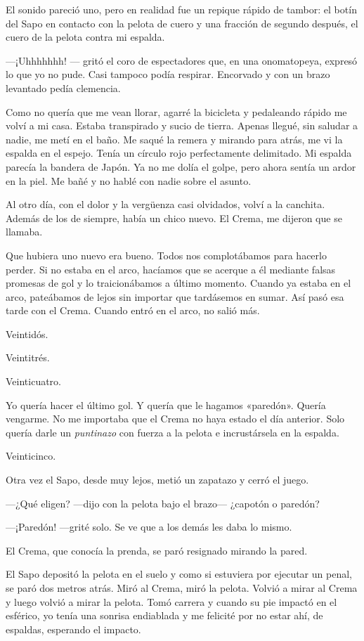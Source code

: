 \documentclass[11pt,twoside,openright]{book}
\begin{document}
 El sonido pareció uno, pero en realidad fue un repique rápido de tambor: el
 botín del Sapo en contacto con la pelota de cuero y una fracción de segundo
 después, el cuero de la pelota contra mi espalda.
 
 ---¡Uhhhhhhh! --- gritó el coro de espectadores que, en una onomatopeya,
 expresó lo que yo no pude. Casi tampoco podía respirar. Encorvado y con un
 brazo levantado pedía clemencia.
 
 Como no quería que me vean llorar, agarré la bicicleta y pedaleando rápido me
 volví a mi casa. Estaba transpirado y sucio de tierra. Apenas llegué, sin
 saludar a nadie, me metí en el baño. Me saqué la remera y mirando para atrás,
 me vi la espalda en el espejo. Tenía un círculo rojo perfectamente delimitado.
 Mi espalda parecía la bandera de Japón. Ya no me dolía el golpe, pero ahora
 sentía un ardor en la piel. Me bañé y no hablé con nadie sobre el asunto.
 
 Al otro día, con el dolor y la vergüenza casi olvidados, volví a la canchita.
 Además de los de siempre, había un chico nuevo.  El Crema, me dijeron que se
 llamaba.
 
 Que hubiera uno nuevo era bueno. Todos nos complotábamos para hacerlo perder.
 Si no estaba en el arco, hacíamos que se acerque a él mediante falsas promesas
 de gol y lo traicionábamos a último momento. Cuando ya estaba en el arco,
 pateábamos de lejos sin importar que tardásemos en sumar. Así pasó esa tarde
 con el Crema. Cuando entró en el arco, no salió más.
 
 Veintidós.
 
 Veintitrés.
 
 Veinticuatro.
 
 Yo quería hacer el último gol. Y quería que le hagamos «paredón». Quería
 vengarme. No me importaba que el Crema no haya estado el día anterior. Solo
 quería darle un \emph{puntinazo} con fuerza a la pelota e incrustársela en la
 espalda.
 
 Veinticinco.
 
 Otra vez el Sapo, desde muy lejos, metió un zapatazo y cerró el juego.
 
 ---¿Qué eligen? ---dijo con la pelota bajo el brazo--- ¿capotón o paredón?
 
 ---¡Paredón! ---grité solo. Se ve que a los demás les daba lo mismo.
 
 El Crema, que conocía la prenda, se paró resignado mirando la pared.
 
 El Sapo depositó la pelota en el suelo y como si estuviera por ejecutar un
 penal,  se paró dos metros atrás. Miró al Crema, miró la pelota. Volvió a mirar
 al Crema y luego volvió a mirar la pelota. Tomó carrera y cuando su pie impactó
 en el esférico, yo tenía una sonrisa endiablada y me felicité por no estar ahí,
 de espaldas, esperando el impacto.
 
\end{document}
